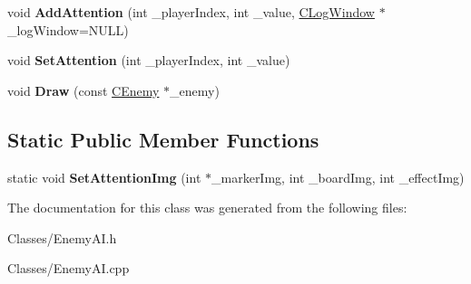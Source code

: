 \begin{DoxyCompactItemize}
\item 
void {\bfseries Add\+Attention} (int \+\_\+player\+Index, int \+\_\+value, \hyperlink{class_c_log_window}{C\+Log\+Window} $\ast$\+\_\+log\+Window=N\+U\+LL)\hypertarget{class_c_enemy_a_i_af5f75832f00bbc28af976893d15a6180}{}\label{class_c_enemy_a_i_af5f75832f00bbc28af976893d15a6180}

\item 
void {\bfseries Set\+Attention} (int \+\_\+player\+Index, int \+\_\+value)\hypertarget{class_c_enemy_a_i_ad3e318eec9e34d215a8b336a89ec75e0}{}\label{class_c_enemy_a_i_ad3e318eec9e34d215a8b336a89ec75e0}

\item 
void {\bfseries Draw} (const \hyperlink{class_c_enemy}{C\+Enemy} $\ast$\+\_\+enemy)\hypertarget{class_c_enemy_a_i_a6c8c0253c5ecb663bc1e73b868b4a5af}{}\label{class_c_enemy_a_i_a6c8c0253c5ecb663bc1e73b868b4a5af}

\end{DoxyCompactItemize}
\subsection*{Static Public Member Functions}
\begin{DoxyCompactItemize}
\item 
static void {\bfseries Set\+Attention\+Img} (int $\ast$\+\_\+marker\+Img, int \+\_\+board\+Img, int \+\_\+effect\+Img)\hypertarget{class_c_enemy_a_i_af0279ae7e871a9139c03517373c53b25}{}\label{class_c_enemy_a_i_af0279ae7e871a9139c03517373c53b25}

\end{DoxyCompactItemize}


The documentation for this class was generated from the following files\+:\begin{DoxyCompactItemize}
\item 
Classes/Enemy\+A\+I.\+h\item 
Classes/Enemy\+A\+I.\+cpp\end{DoxyCompactItemize}
